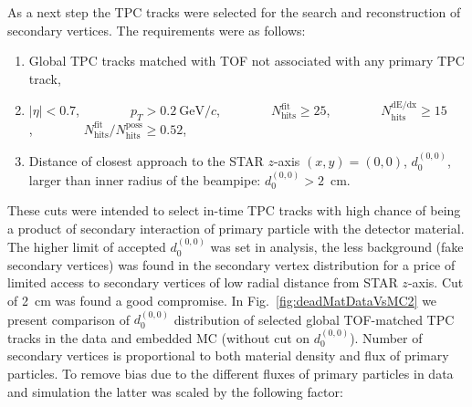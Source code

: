 As a next step the TPC tracks were selected for the search and reconstruction of secondary vertices. The requirements were as follows:\vspace{-5pt}
\begin{enumerate}
  \item Global TPC tracks matched with TOF not associated with any primary TPC track,\vspace{-8pt}
  \item $|\eta|<0.7$,~~~~~~~~$p_{T}>0.2~\text{GeV}/c$,~~~~~~~~$N_{\textrm{hits}}^{\textrm{fit}}\geq25$,~~~~~~~~$N_{\textrm{hits}}^{\textrm{dE/dx}}\geq15$,~~~~~~~~$N_{\textrm{hits}}^{\textrm{fit}}/N_{\textrm{hits}}^{\textrm{poss}}\geq0.52$,\vspace{-8pt}
  \item Distance of closest approach to the STAR $z$-axis $(x, y)=(0, 0)$, $d_{0}^{(0,0)}$, larger than inner radius of the beampipe: $d_{0}^{(0,0)}>2$~cm.
\end{enumerate}%
These cuts were intended to select in-time TPC tracks with high chance of being a product of secondary interaction of primary particle with the detector material. The higher limit of accepted $d_{0}^{(0,0)}$ was set in analysis, the less background (fake secondary vertices) was found in the secondary vertex distribution for a price of limited access to secondary vertices of low radial distance from STAR $z$-axis. Cut of 2~cm was found a good compromise. In Fig.~\ref{fig:deadMatDataVsMC2} we present comparison of $d_{0}^{(0,0)}$ distribution of selected global TOF-matched TPC tracks in the data and embedded MC (without cut on $d_{0}^{(0,0)}$). Number of secondary vertices is proportional to both material density and flux of primary particles. To remove bias due to the different fluxes of primary particles in data and simulation the latter was scaled by the following factor:\vspace{6pt}%
